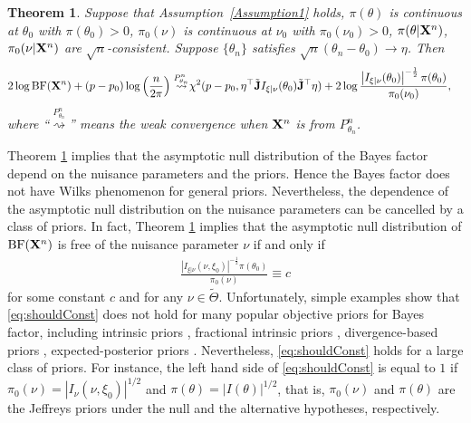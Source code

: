 \documentclass[11pt]{article}
\theoremstyle{plain}
\newtheorem{theorem}{\quad\quad Theorem}
\theoremstyle{definition}
\theoremstyle{remark}
\begin{document}
    \begin{theorem}
        Suppose that Assumption~\ref{Assumption1} holds, $\pi(\theta)$ is continuous at $\theta_0$ with $\pi(\theta_0)>0$, $\pi_0(\nu)$ is continuous at $\nu_0$ with $\pi_0(\nu_0)>0$, $\pi(\theta |\mathbf{X}^{n})$, $\pi_0(\nu|\mathbf{X}^{n})$ are $\sqrt{n}$-consistent.
        Suppose $\{\theta_n\}$ satisfies $\sqrt{n}(\theta_n-\theta_0)\to \eta$.
        Then 
\begin{align*}
    2 \log \textrm{BF} (\mathbf{X}^{n})
    +(p-p_0) \log \left( \frac{n}{2\pi} \right)
\overset{P^n_{\theta_n}}{\rightsquigarrow}
    &
    \chi^2 (p-p_0, \eta^\top\tilde {\mathbf{J}} I_{\xi|\nu}(\theta_0) \tilde{\mathbf{J}}^\top\eta )
    +
   2 \log
       \frac{
           \left|I_{\xi|\nu}(\theta_0)\right|^{-\frac 1 2}\pi(\theta_0) 
   }{
    \pi_0(\nu_0)
}
,
\end{align*}
where ``$\overset{P^n_{\theta_n}}{\rightsquigarrow}$'' means the weak convergence when $\mathbf{X}^n$ is from $P_{\theta_n}^n$.
\label{prop:expansion}
    \end{theorem}
    Theorem \ref{prop:expansion} implies that the asymptotic null distribution of the Bayes factor depend on the nuisance parameters and the priors.
    Hence the Bayes factor does not have Wilks phenomenon for general priors.
Nevertheless, the dependence of the asymptotic null distribution on the nuisance parameters can be cancelled by a class of priors.
In fact, Theorem \ref{prop:expansion} implies that the asymptotic null distribution of $\textrm{BF} (\mathbf{X}^n)$ is free of the nuisance parameter $\nu$ if and only if
\begin{align}\label{eq:shouldConst}
       \frac{
           \left|I_{\xi|\nu}(\nu, \xi_0)\right|^{-\frac 1 2}\pi(\theta_0) 
   }{
    \pi_0(\nu)
}
\equiv c
\end{align}
for some constant $c$ and for any $\nu \in \tilde \Theta$.
Unfortunately, simple examples show that \eqref{eq:shouldConst} does not hold for many popular objective priors for Bayes factor, including intrinsic priors \citep{intrisicBayesFactor}, fractional intrinsic priors \citep{santis1997Alt}, divergence-based priors \citep{Bayarri2008Gen}, expected-posterior priors \citep{Perez2002}.
Nevertheless, \eqref{eq:shouldConst} holds for a large class of priors.
For instance, the left hand side of \eqref{eq:shouldConst} is equal to $1$ if $\pi_0(\nu) = |I_{\nu}(\nu, \xi_0)|^{1/2}$ and $\pi(\theta) = | I (\theta)|^{1/2}$, that is, $\pi_0(\nu)$ and $\pi(\theta)$ are the Jeffreys priors under the null and the alternative hypotheses, respectively.
\end{document}
